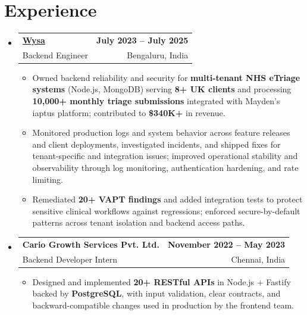 \documentclass[letterpaper,10pt]{article}
\makeatletter
\newcommand{\resumeItem}[1]{
  \item\small{#1\vspace{-1pt}}
}
\newcommand{\resumeSubheading}[4]{
  \vspace{1pt}\item
    \begin{tabular*}{0.985\textwidth}[t]{l@{\extracolsep{\fill}}r}
      \textbf{#1} & \textbf{\small #2} \\
      {\small\color{ResumeSlate} #3} & {\small\color{ResumeSlate} #4} \\
    \end{tabular*}\vspace{-6pt}
}
\newcommand{\resumeSubHeadingListStart}{\begin{itemize}[leftmargin=0.0in, label={}, itemsep=2pt, topsep=2pt]}
\newcommand{\resumeSubHeadingListEnd}{\end{itemize}}
\newcommand{\resumeItemListStart}{\begin{itemize}[leftmargin=0.18in, itemsep=2pt, topsep=1pt]}
\newcommand{\resumeItemListEnd}{\end{itemize}\vspace{-4pt}}
\makeatother
\begin{document}
\section{Experience}
\resumeSubHeadingListStart
  \resumeSubheading
    {\href{https://www.wysa.io}{Wysa}}{July 2023 -- July 2025}
    {Backend Engineer}{Bengaluru, India}
    \resumeItemListStart
      \resumeItem{Owned backend reliability and security for \textbf{multi-tenant NHS eTriage systems} (Node.js, MongoDB) serving \textbf{8+ UK clients} and processing \textbf{10{,}000+ monthly triage submissions} integrated with Mayden's iaptus platform; contributed to \textbf{\$340K+} in revenue.}
      \resumeItem{Monitored production logs and system behavior across feature releases and client deployments, investigated incidents, and shipped fixes for tenant-specific and integration issues; improved operational stability and observability through log monitoring, authentication hardening, and rate limiting.}
      \resumeItem{Remediated \textbf{20+ VAPT findings} and added integration tests to protect sensitive clinical workflows against regressions; enforced secure-by-default patterns across tenant isolation and backend access paths.}
    \resumeItemListEnd
  \resumeSubheading
    {Cario Growth Services Pvt. Ltd.}{November 2022 -- May 2023}
    {Backend Developer Intern}{Chennai, India}
    \resumeItemListStart
      \resumeItem{Designed and implemented \textbf{20+ RESTful APIs} in Node.js + Fastify backed by \textbf{PostgreSQL}, with input validation, clear contracts, and backward-compatible changes used in production by the frontend team.}
    \resumeItemListEnd
\resumeSubHeadingListEnd
\vspace{-4pt}
\end{document}
